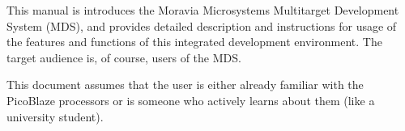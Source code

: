 This manual is introduces the Moravia Microsystems Multitarget Development System (MDS), and provides detailed description and instructions for usage of the features and functions of this integrated development environment. The target audience is, of course, users of the MDS.

This document assumes that the user is either already familiar with the PicoBlaze processors or is someone who actively learns about them (like a university student).
